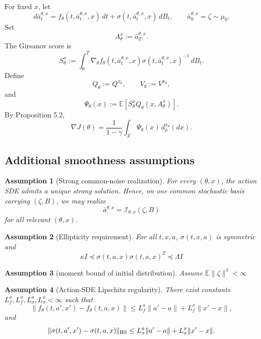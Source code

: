 \documentclass{article}
\newtheorem{ass}{Assumption}
\theoremstyle{definition}
\theoremstyle{remark}
\theoremstyle{mystyle}
\newcommand{\E}{\mathbb{E}}
\newcommand{\1}{\mathbbm{1}}
\begin{document}
For fixed \(x\), let
\[
d\bar a_t^{\theta,x}
=
f_\theta(t,\bar a_t^{\theta,x},x)\,dt
+
\sigma(t,\bar a_t^{\theta,x},x)\,dB_t,
\qquad
\bar a_0^{\theta,x}=\zeta\sim\mu_0.
\]
Set
\[
A_\theta^x:=\bar a_T^{\theta,x}.
\]
The Girsanov score is
\[
S_\theta^x
:=
\int_0^T
\nabla_\theta f_\theta(t,\bar a_t^{\theta,x},x)
\sigma(t,\bar a_t^{\theta,x},x)^{-1}\,dB_t.
\]
Define
\[
Q_\theta:=Q^{\pi_\theta},
\qquad
V_\theta:=V^{\pi_\theta},
\]
and
\[
\Psi_\theta(x)
:=
\mathbb E
\left[
S_\theta^x Q_\theta(x,A_\theta^x)
\right].
\]
By Proposition 5.2,
\[
\nabla J(\theta)
=
\frac{1}{1-\gamma}
\int_{\mathcal X}
\Psi_\theta(x)\,d_\rho^{\pi_\theta}(dx).
\tag{PG}
\]

\subsection{Additional smoothness assumptions}

\begin{ass}[Strong common-noise realization]
For every \((\theta,x)\), the action SDE admits a unique strong solution. Hence, on one common stochastic basis carrying \((\zeta,B)\), we may realize
\[
\bar a_\cdot^{\theta,x}
=
\mathcal I_{\theta,x}(\zeta,B)
\]
for all relevant \((\theta,x)\).
\end{ass}

\begin{ass}[Ellipticity requirement]
For all $t,x,a$, $\sigma(t,x,a)$ is symmetric and 
\begin{equation}
     \kappa I \preceq \sigma(t,a,x)\sigma(t,a,x)^T\preceq \Lambda I
\end{equation}
\end{ass}

\begin{ass}[moment bound of initial distribution]
Assume $\E\|\zeta\|^4<\infty$
\end{ass}

\begin{ass}[Action-SDE Lipschitz regularity]
There exist constants \(L_f^a,L_f^x,L_\sigma^a,L_\sigma^x<\infty\) such that
\[
\|f_{\theta}(t,a',x')-f_\theta(t,a,x)\|
\le
L_f^a\|a'-a\|
+
L_f^x\|x'-x\|
,
\]
and
\[
\|\sigma(t,a',x')-\sigma(t,a,x)\|_{\rm HS}
\le
L_\sigma^a\|a'-a\|
+
L_\sigma^x\|x'-x\|.
\]
\end{ass}
\end{document}
